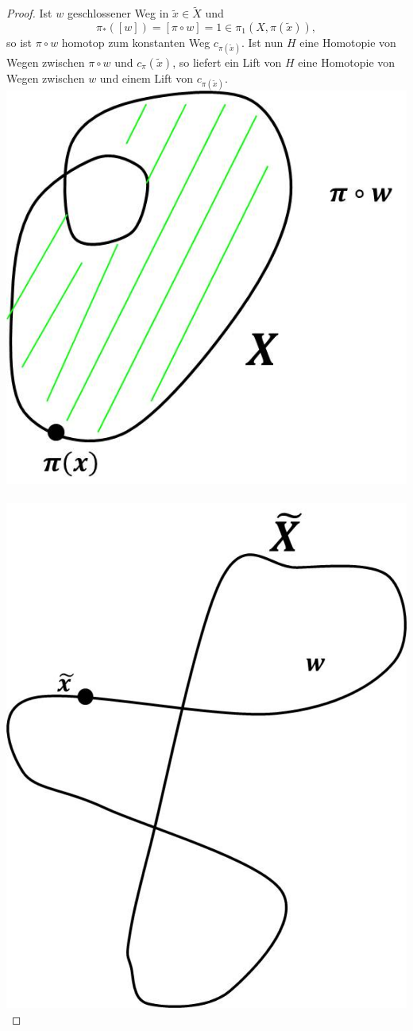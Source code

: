 \documentclass[a4paper,11pt,notitlepage]{report}
\theoremstyle{definition}
\begin{document}
\begin{proof}
	Ist $w$ geschlossener Weg in $\widetilde{x} \in \widetilde{X}$ und
$$\pi_*([w]) = [\pi \circ w] = 1 \in \pi_1(X, \pi(\widetilde{x})),$$
so ist $\pi \circ w$ homotop zum konstanten Weg $c_{\pi(\widetilde{x})}$. Ist nun $H$ eine Homotopie von Wegen zwischen $\pi \circ w$ und $c_\pi(\widetilde{x})$, so liefert ein Lift von $H$ eine Homotopie von Wegen zwischen $w$ und einem Lift von $c_{\pi(\widetilde{x})}$. 
\newline
\includegraphics[scale=0.4]{images/Homotopie_konstanter_Weg.jpg} $\qquad$
\includegraphics[scale=0.4]{images/Homotopie_konstanter_Weg_Lift.jpg}

\end{proof}
\end{document}
